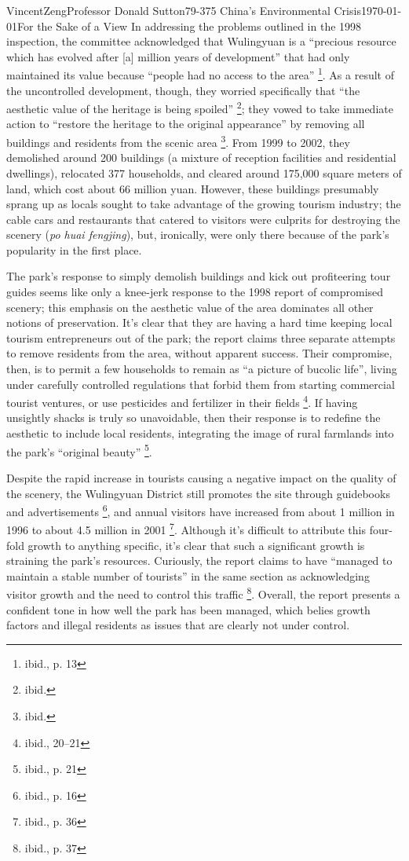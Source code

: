 \documentclass[12pt]{article}
\begin{document}
\begin{mla}{Vincent}{Zeng}{Professor Donald Sutton}{79-375 China's Environmental Crisis}{\today}{For the Sake of a View}
In addressing the problems outlined in the 1998 inspection, the committee
acknowledged that Wulingyuan is a ``precious resource which has evolved after
[a] million years of development'' that had only
maintained its value because ``people had no access to the area''
\footnote{ibid., p. 13}. As a result of the uncontrolled development, though,
they worried specifically that ``the aesthetic value of the heritage is being
spoiled'' \footnote{ibid.}; they vowed to take immediate action to ``restore
the heritage to the original appearance'' by removing all buildings and
residents from the scenic area \footnote{ibid.}. From 1999 to 2002, they
demolished around 200 buildings (a mixture of reception facilities and
residential dwellings), relocated 377 households, and cleared around 175,000
square meters of land, which cost about 66 million yuan. However, these
buildings presumably sprang up as locals sought to take advantage of the
growing tourism industry; the cable cars and restaurants that catered to
visitors were culprits for destroying the scenery (\textit{po huai fengjing}),
but, ironically, were only there because of the park's popularity in the first
place.

The park's response to simply demolish buildings and kick out profiteering tour
guides seems like only a knee-jerk response to the 1998 report of compromised
scenery; this emphasis on the aesthetic value of the area dominates all other
notions of preservation. It's clear that they are having a hard time keeping local tourism entrepreneurs out of the
park; the report claims three separate attempts to remove residents from the
area, without apparent success. Their compromise, then, is to permit a few
households to remain as ``a picture of bucolic life'', living under carefully
controlled regulations that forbid them from starting commercial tourist
ventures, or use pesticides and fertilizer in their fields \footnote{ibid.,
20--21}. If having unsightly shacks is truly so unavoidable, then their
response is to
redefine the aesthetic to include local residents, integrating the image of
rural farmlands into the park's ``original beauty'' \footnote{ibid., p. 21}.

Despite the rapid increase in tourists causing a negative impact on the quality of the scenery,
the Wulingyuan District still promotes the site through guidebooks and
advertisements \footnote{ibid., p. 16}, and annual visitors have increased from
about 1 million in 1996 to  about 4.5 million in 2001 \footnote{ibid., p. 36}.
Although it's difficult to attribute this four-fold growth to anything
specific, it's clear that such a significant growth is straining the park's
resources. Curiously, the report claims to have ``managed to maintain a stable
number of tourists'' in the same section as acknowledging visitor growth and
the need to control this traffic \footnote{ibid., p. 37}. Overall, the report
presents a confident tone in how well the park has been managed, which belies
growth factors and illegal residents as issues that are clearly not under
control.


\end{mla}
\end{document}
